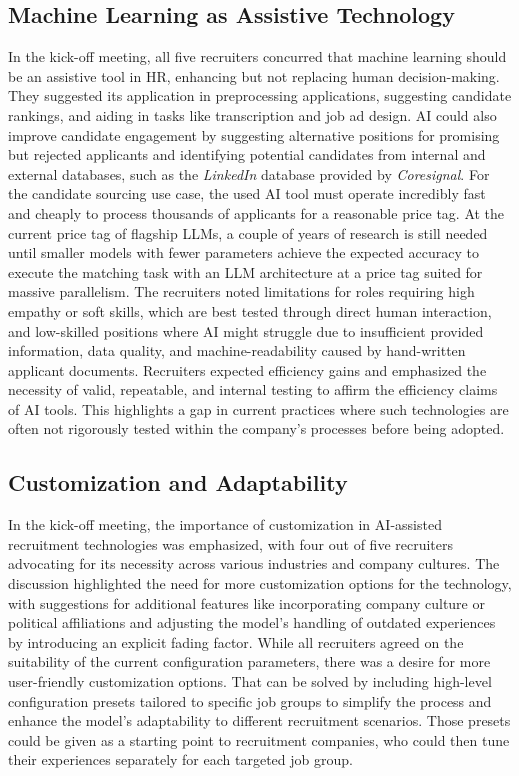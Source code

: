 \documentclass[draft,final]{thesisclass} %
\begin{document}
\subsection{Machine Learning as Assistive Technology} \label{interpretation_ml_as_assistive_technology}
In the kick-off meeting, all five recruiters concurred that machine learning should be an assistive tool in \acs{HR}, enhancing but not replacing human decision-making. They suggested its application in preprocessing applications, suggesting candidate rankings, and aiding in tasks like transcription and job ad design. \acs{AI} could also improve candidate engagement by suggesting alternative positions for promising but rejected applicants and identifying potential candidates from internal and external databases, such as the \textit{LinkedIn} database provided by \textit{Coresignal}. For the candidate sourcing use case, the used \acs{AI} tool must operate incredibly fast and cheaply to process thousands of applicants for a reasonable price tag. At the current price tag of flagship \gls{LLM}s, a couple of years of research is still needed until smaller models with fewer parameters achieve the expected accuracy to execute the matching task with an \gls{LLM} architecture at a price tag suited for massive parallelism. The recruiters noted limitations for roles requiring high empathy or soft skills, which are best tested through direct human interaction, and low-skilled positions where \acs{AI} might struggle due to insufficient provided information, data quality, and machine-readability caused by hand-written applicant documents. Recruiters expected efficiency gains and emphasized the necessity of valid, repeatable, and internal testing to affirm the efficiency claims of \acs{AI} tools. This highlights a gap in current practices where such technologies are often not rigorously tested within the company's processes before being adopted.

\subsection{Customization and Adaptability}
In the kick-off meeting, the importance of customization in \acs{AI}-assisted recruitment technologies was emphasized, with four out of five recruiters advocating for its necessity across various industries and company cultures. The discussion highlighted the need for more customization options for the technology, with suggestions for additional features like incorporating company culture or political affiliations and adjusting the model's handling of outdated experiences by introducing an explicit fading factor. While all recruiters agreed on the suitability of the current configuration parameters, there was a desire for more user-friendly customization options. That can be solved by including high-level configuration presets tailored to specific job groups to simplify the process and enhance the model's adaptability to different recruitment scenarios. Those presets could be given as a starting point to recruitment companies, who could then tune their experiences separately for each targeted job group.
\end{document}
